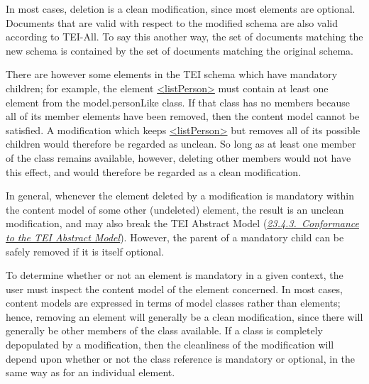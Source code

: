 In most cases, deletion is a clean modification, since most elements are optional. Documents that are valid with respect to the modified schema are also valid according to TEI-All. To say this another way, the set of documents matching the new schema is contained by the set of documents matching the original schema.\par
There are however some elements in the TEI schema which have mandatory children; for example, the element \hyperref[TEI.listPerson]{<listPerson>} must contain at least one element from the \textsf{model.personLike} class. If that class has no members because all of its member elements have been removed, then the content model cannot be satisfied. A modification which keeps \hyperref[TEI.listPerson]{<listPerson>} but removes all of its possible children would therefore be regarded as unclean. So long as at least one member of the class remains available, however, deleting other members would not have this effect, and would therefore be regarded as a clean modification.\par
In general, whenever the element deleted by a modification is mandatory within the content model of some other (undeleted) element, the result is an unclean modification, and may also break the TEI Abstract Model (\textit{\hyperref[CFAM]{23.4.3.\ Conformance to the TEI Abstract Model}}). However, the parent of a mandatory child can be safely removed if it is itself optional.\par
To determine whether or not an element is mandatory in a given context, the user must inspect the content model of the element concerned. In most cases, content models are expressed in terms of model classes rather than elements; hence, removing an element will generally be a clean modification, since there will generally be other members of the class available. If a class is completely depopulated by a modification, then the cleanliness of the modification will depend upon whether or not the class reference is mandatory or optional, in the same way as for an individual element.
